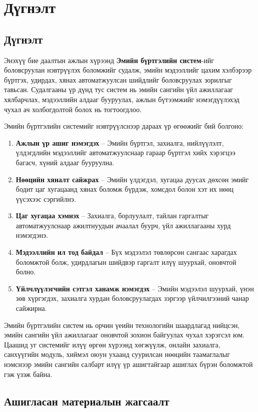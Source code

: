 \chapter{Дүгнэлт}
\label{Chapter4}

\section{Дүгнэлт}
\qquad
Энэхүү бие даалтын ажлын хүрээнд \textbf{Эмийн бүртгэлийн систем}-ийг боловсруулан нэвтрүүлэх боломжийг судалж, эмийн мэдээллийг цахим хэлбэрээр бүртгэх, удирдах, хянах автоматжуулсан шийдлийг боловсруулах зорилгыг тавьсан. Судалгааны үр дүнд тус систем нь эмийн сангийн үйл ажиллагааг хялбарчлах, мэдээллийн алдааг бууруулах, ажлын бүтээмжийг нэмэгдүүлэхэд чухал ач холбогдолтой болох нь тогтоогдлоо.

Эмийн бүртгэлийн системийг нэвтрүүлснээр дараах үр өгөөжийг бий болгоно:
\begin{enumerate}
\item \textbf{Ажлын үр ашиг нэмэгдэх} – Эмийн бүртгэл, захиалга, нийлүүлэлт, үлдэгдлийн мэдээллийг автоматжуулснаар гараар бүртгэл хийх хэрэгцээ багасч, хүний алдааг бууруулна.
\item \textbf{Нөөцийн хяналт сайжрах} – Эмийн үлдэгдэл, хугацаа дуусах дөхсөн эмийг бодит цаг хугацаанд хянах боломж бүрдэж, хомсдол болон хэт их нөөц үүсэхээс сэргийлнэ.
\item \textbf{Цаг хугацаа хэмнэх} – Захиалга, борлуулалт, тайлан гаргалтыг автоматжуулснаар ажилтнуудын ачаалал буурч, үйл ажиллагааны хурд нэмэгдэнэ.
\item \textbf{Мэдээллийн ил тод байдал} – Бүх мэдээлэл төвлөрсөн сангаас харагдах боломжтой болж, удирдлагын шийдвэр гаргалт илүү шуурхай, оновчтой болно.
\item \textbf{Үйлчлүүлэгчийн сэтгэл ханамж нэмэгдэх} – Эмийн мэдээлэл шуурхай, үнэн зөв хүргэгдэх, захиалга хурдан боловсруулагдах зэргээр үйлчилгээний чанар сайжирна.
\end{enumerate}

Эмийн бүртгэлийн систем нь орчин үеийн технологийн шаардлагад нийцсэн, эмийн сангийн үйл ажиллагааг оновчтой зохион байгуулах чухал хэрэгсэл юм. Цаашид уг системийг илүү өргөн хүрээнд хөгжүүлж, онлайн захиалга, санхүүгийн модуль, хиймэл оюун ухаанд суурилсан нөөцийн таамаглалыг нэмснээр эмийн сангийн салбарт илүү үр ашигтайгаар ашиглах бүрэн боломжтой гэж үзэж байна.

\newpage

\section{Ашигласан материалын жагсаалт}

